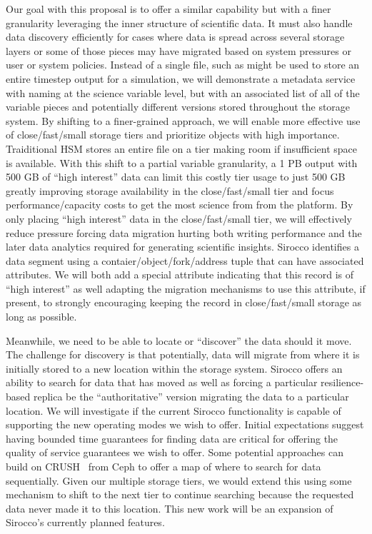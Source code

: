 Our goal with this proposal is to offer a similar capability but with a finer
granularity leveraging the inner structure of scientific data. It must also
handle data discovery efficiently for cases where data is spread across several
storage layers or some of those pieces may have migrated based on system
pressures or user or system policies. Instead of a single file, such as might
be used to store an entire timestep output for a simulation, we will
demonstrate a metadata service with naming at the science variable level, but
with an associated list of all of the variable pieces and potentially different
versions stored throughout the storage system. By shifting to a finer-grained
approach, we will enable more effective use of close/fast/small storage tiers
and prioritize objects with high importance.  Traiditional HSM stores an entire
file on a tier making room if insufficient space is available.  With this shift
to a partial variable granularity, a 1 PB output with 500 GB of ``high
interest'' data can limit this costly tier usage to just 500 GB greatly
improving storage availability in the close/fast/small tier and focus
performance/capacity costs to get the most science from from the platform.  By
only placing ``high interest'' data in the close/fast/small tier, we will
effectively reduce pressure forcing data migration hurting both writing
performance and the later data analytics required for generating scientific
insights.  Sirocco identifies a data segment using a
contaier/object/fork/address tuple that can have associated attributes. We will
both add a special attribute indicating that this record is of ``high
interest'' as well adapting the migration mechanisms to use this attribute, if
present, to strongly encouraging keeping the record in close/fast/small storage
as long as possible.

Meanwhile, we need to be able to locate or ``discover'' the data should it
move.  The challenge for discovery is that potentially, data will migrate from
where it is initially stored to a new location within the storage system.
Sirocco offers an ability to search for data that has moved as well as forcing
a particular resilience-based replica be the ``authoritative'' version
migrating the data to a particular location. We will investigate if the current
Sirocco functionality is capable of supporting the new operating modes we wish
to offer. Initial expectations suggest having bounded time guarantees for
finding data are critical for offering the quality of service guarantees we
wish to offer. Some potential approaches can build on CRUSH~\cite{ceph} from
Ceph to offer a map of where to search for data sequentially. Given our
multiple storage tiers, we would extend this using some mechanism to shift to
the next tier to continue searching because the requested data never made it to
this location. This new work will be an expansion of Sirocco's currently
planned features.

